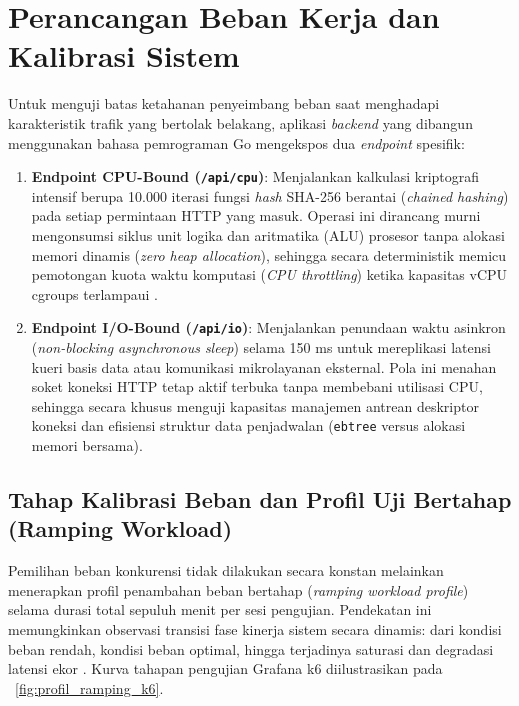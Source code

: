 \section{Perancangan Beban Kerja dan Kalibrasi Sistem}
Untuk menguji batas ketahanan penyeimbang beban saat menghadapi karakteristik trafik yang bertolak belakang, aplikasi \textit{backend} yang dibangun menggunakan bahasa pemrograman Go mengekspos dua \textit{endpoint} spesifik:
\begin{enumerate}
    \item \textbf{Endpoint CPU-Bound (\texttt{/api/cpu})}: Menjalankan kalkulasi kriptografi intensif berupa 10.000 iterasi fungsi \textit{hash} SHA-256 berantai (\textit{chained hashing}) pada setiap permintaan HTTP yang masuk. Operasi ini dirancang murni mengonsumsi siklus unit logika dan aritmatika (ALU) prosesor tanpa alokasi memori dinamis (\textit{zero heap allocation}), sehingga secara deterministik memicu pemotongan kuota waktu komputasi (\textit{CPU throttling}) ketika kapasitas vCPU cgroups terlampaui \citep{shetty2025cpu}.
    \item \textbf{Endpoint I/O-Bound (\texttt{/api/io})}: Menjalankan penundaan waktu asinkron (\textit{non-blocking asynchronous sleep}) selama 150 ms untuk mereplikasi latensi kueri basis data atau komunikasi mikrolayanan eksternal. Pola ini menahan soket koneksi HTTP tetap aktif terbuka tanpa membebani utilisasi CPU, sehingga secara khusus menguji kapasitas manajemen antrean deskriptor koneksi dan efisiensi struktur data penjadwalan (\texttt{ebtree} versus alokasi memori bersama).
\end{enumerate}

\subsection{Tahap Kalibrasi Beban dan Profil Uji Bertahap (Ramping Workload)}
Pemilihan beban konkurensi tidak dilakukan secara konstan melainkan menerapkan profil penambahan beban bertahap (\textit{ramping workload profile}) selama durasi total sepuluh menit per sesi pengujian. Pendekatan ini memungkinkan observasi transisi fase kinerja sistem secara dinamis: dari kondisi beban rendah, kondisi beban optimal, hingga terjadinya saturasi dan degradasi latensi ekor \citep{wodislawski2026ponytail}. Kurva tahapan pengujian Grafana k6 diilustrasikan pada \figurename\ \ref{fig:profil_ramping_k6}.

